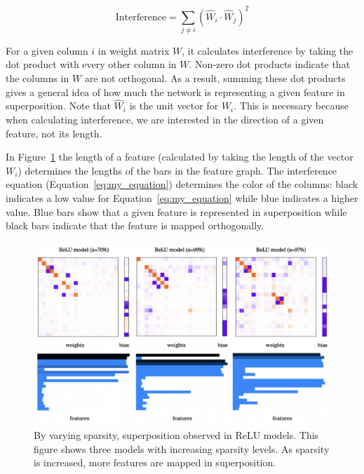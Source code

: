 \documentclass{article} %
\begin{document}
\begin{equation}
\label{eq:my_equation}
\text{Interference} = \sum_{j \neq i} (\hat{W}_i \cdot \hat{W}_j)^2
\end{equation}

For a given column $i$ in weight matrix $W$, it calculates interference by taking
the dot product with every other column in $W$. Non-zero dot products indicate
that the columns in $W$ are not orthogonal. As a result, summing these dot 
products gives a general idea of how much the network is representing a given
feature in superposition. Note that $\hat{W}_i$ is the unit vector for $W_i$. 
This is necessary because when calculating interference, we are interested in
the direction of a given feature, not its length.\newline

In Figure~\ref{fig:sparsity_1} the length of a feature (calculated by taking the
length of the vector $W_i$) determines the lengths of the bars in the feature
graph. The interference equation (Equation~\ref{eq:my_equation}) determines the
color of the columns: black indicates a low value for Equation~\ref{eq:my_equation}
while blue indicates a higher value. Blue bars show that a given feature is represented
in superposition while black bars indicate that the feature is mapped orthogonally.
    

\begin{figure}[h]
    \centering
    \includegraphics[width=0.75\linewidth]{demonstrating_superposition/images/sparsity_superposition1.png}
    \captionsetup{font=footnotesize, width=0.7\linewidth} %
    \caption{
        By varying sparsity, superposition observed in ReLU models. This figure
        shows three models with increasing sparsity levels. As sparsity is increased, 
        more features are mapped in superposition.
    }
    \label{fig:sparsity_1}
\end{figure}
\end{document}
